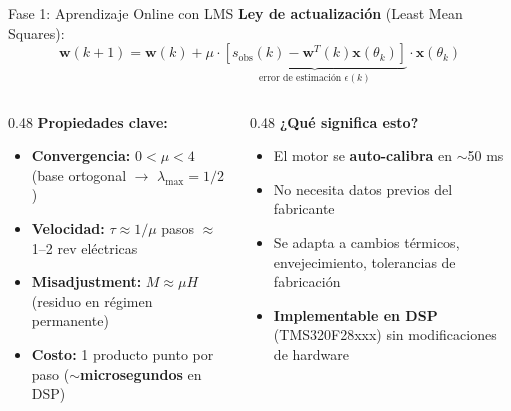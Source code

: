 \begin{frame}{Fase 1: Aprendizaje Online con LMS}
    \textbf{Ley de actualización} (Least Mean Squares):
    \begin{equation}
        \mathbf{w}(k+1) = \mathbf{w}(k) + \mu \cdot \underbrace{\left[s_{\text{obs}}(k) - \mathbf{w}^T(k)\mathbf{x}(\theta_k)\right]}_{\text{error de estimación } \epsilon(k)} \cdot \mathbf{x}(\theta_k)
    \end{equation}
    
    \vspace{0.2cm}
    
    \begin{columns}[T]
    \begin{column}{0.48\textwidth}
        \textbf{Propiedades clave:}
        \begin{itemize}
            \item \textbf{Convergencia:} $0 < \mu < 4$ (base ortogonal $\rightarrow$ $\lambda_{\max} = 1/2$)
            \item \textbf{Velocidad:} $\tau \approx 1/\mu$ pasos $\approx$ 1--2 rev eléctricas
            \item \textbf{Misadjustment:} $M \approx \mu H$ (residuo en régimen permanente)
            \item \textbf{Costo:} 1 producto punto por paso ($\sim$\textbf{microsegundos} en DSP)
        \end{itemize}
    \end{column}
    \begin{column}{0.48\textwidth}
        \textbf{¿Qué significa esto?}
        \begin{itemize}
            \item El motor se \textbf{auto-calibra} en $\sim$50 ms
            \item No necesita datos previos del fabricante
            \item Se adapta a cambios térmicos, envejecimiento, tolerancias de fabricación
            \item \textbf{Implementable en DSP} (TMS320F28xxx) sin modificaciones de hardware
        \end{itemize}
    \end{column}
    \end{columns}
\end{frame}


